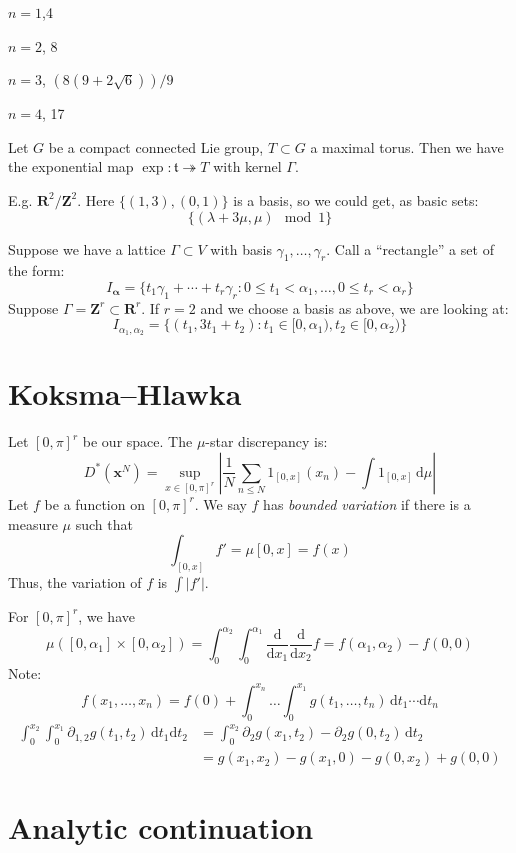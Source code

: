 \documentclass{article}
\newcommand{\bR}{\mathbf{R}}
\newcommand{\bx}{\boldsymbol{x}}
\newcommand{\bZ}{\mathbf{Z}}
\newcommand{\dd}{\mathrm{d}}
\newcommand{\ft}{\mathfrak{t}}
\theoremstyle{definition}
\begin{document}
$n=1$,4

$n=2$, 8

$n=3$, $(8 (9 + 2 \sqrt 6))/9$

$n=4$, 17

Let $G$ be a compact connected Lie group, $T\subset G$ a maximal torus. Then 
we have the exponential map $\exp\colon \ft\twoheadrightarrow T$ with kernel 
$\Gamma$. 

E.g. $\bR^2/\bZ^2$. Here $\{(1,3),(0,1)\}$ is a basis, so we could get, as 
basic sets:
\[
	\{(\lambda+3\mu,\mu)\mod 1\}
\]

Suppose we have a lattice $\Gamma\subset V$ with basis 
$\gamma_1,\dots,\gamma_r$. Call a ``rectangle'' a set of the form:
\[
	I_{\boldsymbol\alpha} = \{t_1 \gamma_1 + \cdots + t_r \gamma_r : 0\leqslant t_1 < \alpha_1,\dots,0\leqslant t_r < \alpha_r\}
\]
Suppose $\Gamma=\bZ^r\subset \bR^r$. If $r=2$ and we choose a basis as above, 
we are looking at:
\[
	I_{\alpha_1,\alpha_2} = \{(t_1,3t_1+t_2) : t_1\in [0,\alpha_1),t_2\in [0,\alpha_2)\}
\]





\section{Koksma--Hlawka}

Let $[0,\pi]^r$ be our space. The $\mu$-star discrepancy is:
\[
	D^\ast(\bx^N) = \sup_{x\in [0,\pi]^r} \left| \frac{1}{N} \sum_{n\leqslant N} 1_{[0,x]}(x_n) - \int 1_{[0,x]} \, \dd\mu\right|
\]
Let $f$ be a function on $[0,\pi]^r$. We say $f$ has \emph{bounded 
variation} if there is a measure $\mu$ such that 
\[
	\int_{[0,x]} f' = \mu[0,x] = f(x)
\]
Thus, the variation of $f$ is $\int |f'|$. 

For $[0,\pi]^r$, we have 
\[
	\mu([0,\alpha_1]\times [0,\alpha_2]) = \int_0^{\alpha_2} \int_0^{\alpha_1} \frac{\dd}{\dd x_1} \frac{\dd}{\dd x_2} f = f(\alpha_1,\alpha_2) - f(0,0)
\]
Note:
\[
	f(x_1,\dots,x_n) = f(0) + \int_0^{x_n} \dots \int_0^{x_1} g(t_1,\dots,t_n)\,  \dd t_1\dotsm \dd t_n
\]
\begin{align*}
	\int_0^{x_2} \int_0^{x_1} \partial_{1,2} g(t_1,t_2)\,  \dd t_1\dd t_2 
		&= \int_0^{x_2} \partial_2g(x_1,t_2) - \partial_2 g(0,t_2)\, \dd t_2 \\
		&= g(x_1,x_2) - g(x_1,0) - g(0,x_2) + g(0,0)
\end{align*}





\section{Analytic continuation}
\end{document}
